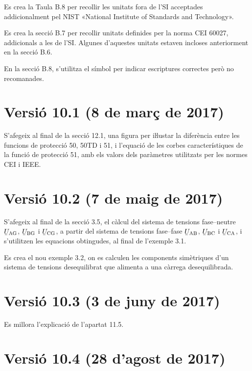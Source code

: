 Es crea la Taula B.8 per recollir les unitats fora de l'SI acceptades addicionalment pel NIST «National Institute of Standards and Technology».

Es crea la secció B.7 per recollir  unitats definides per la norma  CEI 60027, addicionals a les de l'SI. Algunes d'aquestes unitats estaven incloses anteriorment en la secció B.6.

En la secció B.8, s'utilitza el símbol \textcolor{Blue}\faQuestionCircle{} per indicar escriptures correctes però no recomanades.

\section*{Versió 10.1 (8 de març de 2017)}

S'afegeix al final de la secció 12.1, una figura per iŀlustar la diferència entre les funcions de protecció 50, 50TD i 51, i l'equació de les corbes característiques de la funció de protecció 51, amb els valors dels paràmetres utilitzats per les normes CEI i IEEE.

\section*{Versió 10.2 (7 de maig de 2017)}

S'afegeix al final de la secció 3.5, el càlcul del sistema de tensions fase--neutre $\cmplx{U}\ped{AG}$, $\cmplx{U}\ped{BG}$ i $\cmplx{U}\ped{CG}$, a partir del sistema de tensions fase--fase $\cmplx{U}\ped{AB}$, $\cmplx{U}\ped{BC}$ i $\cmplx{U}\ped{CA}$, i s'utilitzen les equacions obtingudes, al final de l'exemple 3.1.

Es crea el nou exemple 3.2, on es calculen les components simètriques d'un sistema de tensions desequilibrat que alimenta a una càrrega desequilibrada.

\section*{Versió 10.3 (3 de juny de 2017)}

Es millora l'explicació de l'apartat 11.5.

\section*{Versió 10.4 (28 d'agost de 2017)}

